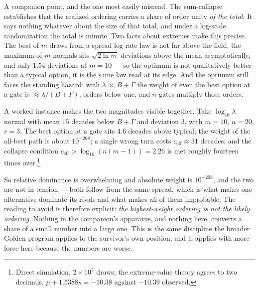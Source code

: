 \begin{remark}\label{sch:rem:absolute}
A companion point, and the one most easily misread. The sum-collapse
establishes that the realized ordering carries a share of order unity
\emph{of the total}. It says nothing whatever about the size of that
total, and under a log-scale randomization the total is minute. Two facts about extremes make this precise. The best of $m$ draws from a
spread log-rate law is not far above the field: the maximum of $m$
normals sits $\sqrt{2\ln m}$ deviations above the mean asymptotically,
and only $1.54$ deviations at $m=10$ --- so the optimum is not
qualitatively better than a typical option, it is the same law read at
its edge. And the optimum still faces the standing hazard: with
$\lambda\ll B+\Gamma$ the weight of even the best option at a gate is
$\approx\lambda/(B+\Gamma)$, orders below one, and $n$ gates multiply
those orders.

A worked instance makes the two magnitudes visible together. Take
$\log_{10}\lambda$ normal with mean $15$ decades below $B+\Gamma$ and
deviation $3$, with $m=10$, $n=20$, $r=3$. The best option at a gate
sits $4.6$ decades above typical; the weight of the all-best path is
about $10^{-208}$; a single wrong turn costs $c_{\mathrm{eff}}\approx31$
decades; and the collapse condition $c_{\mathrm{eff}}>\log_{10}(n(m-1))
=2.26$ is met roughly fourteen times over.\footnote{Direct simulation,
$2\times10^{5}$ draws; the extreme-value theory agrees to two decimals,
$\mu+1.5388s=-10.38$ against $-10.39$ observed.}

So relative dominance is overwhelming and absolute weight is
$10^{-208}$, and the two are not in tension --- both follow from the
same spread, which is what makes one alternative dominate its rivals and
what makes all of them improbable. The reading to avoid is therefore
explicit: \emph{the highest-weight ordering is not the likely ordering}.
Nothing in the companion's apparatus, and nothing here, converts a share
of a small number into a large one. This is the same discipline
the broader Golden program applies to the survivor's own position, and
it applies with more force here because the numbers are worse.
\end{remark}

